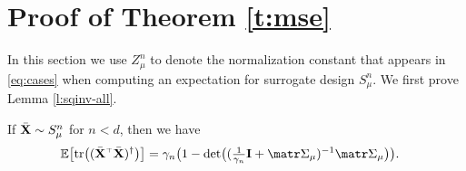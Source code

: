 \documentclass[../../thesis.tex]{subfiles}
\begin{document}
\section{Proof of Theorem \ref{t:mse}}
\label{a:mse-proof}
In this section we use $Z_\mu^n$ to denote the normalization
constant that appears in \eqref{eq:cases} when computing an expectation for surrogate design
$S_\mu^n$.
We first prove Lemma \ref{l:sqinv-all}. %
\begin{lemma}\label{l:sqinv-under}
  If  ${\bar{\mathbf X}}\sim S_\mu^n$ for $n<d$, then we have
  \begin{align*}
    \E\big[\tr\big((\Xb^\top\Xb)^{\dagger}\big)\big]
     & ={\gamma_n}\big(1- \det\!\big((\tfrac1{\gamma_n}\I+\Sigmab_\mu)^{-1}\Sigmab_\mu\big)\big).
  \end{align*}
\end{lemma}
\end{document}
